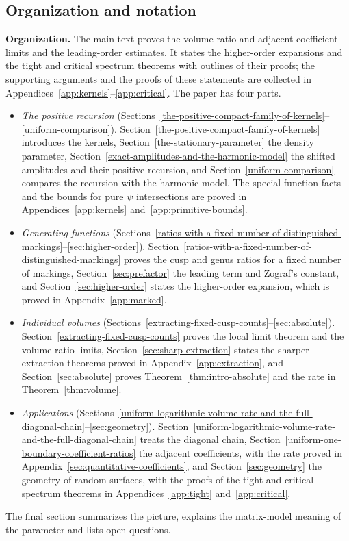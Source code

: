 \subsection{Organization and notation}\label{subsec:notation}
\textbf{Organization.}
The main text proves the volume-ratio and adjacent-coefficient limits and
the leading-order estimates. It states the higher-order expansions and
the tight and critical spectrum theorems with outlines of their proofs;
the supporting arguments and the proofs of these statements are collected
in Appendices~\ref{app:kernels}--\ref{app:critical}.
The paper has four parts.
\begin{itemize}[leftmargin=*]
\item \emph{The positive recursion}
(Sections~\ref{the-positive-compact-family-of-kernels}--\ref{uniform-comparison}).
Section~\ref{the-positive-compact-family-of-kernels} introduces the
kernels, Section~\ref{the-stationary-parameter} the density parameter,
Section~\ref{exact-amplitudes-and-the-harmonic-model} the shifted
amplitudes and their positive recursion, and
Section~\ref{uniform-comparison} compares the recursion with the harmonic
model. The special-function facts and the bounds for pure $\psi$
intersections are proved in Appendices~\ref{app:kernels}
and~\ref{app:primitive-bounds}.
\item \emph{Generating functions}
(Sections~\ref{ratios-with-a-fixed-number-of-distinguished-markings}--\ref{sec:higher-order}).
Section~\ref{ratios-with-a-fixed-number-of-distinguished-markings} proves
the cusp and genus ratios for a fixed number of markings,
Section~\ref{sec:prefactor} the leading term and Zograf's constant, and
Section~\ref{sec:higher-order} states the higher-order expansion, which is
proved in Appendix~\ref{app:marked}.
\item \emph{Individual volumes}
(Sections~\ref{extracting-fixed-cusp-counts}--\ref{sec:absolute}).
Section~\ref{extracting-fixed-cusp-counts} proves the local limit theorem
and the volume-ratio limits, Section~\ref{sec:sharp-extraction} states the
sharper extraction theorems proved in Appendix~\ref{app:extraction}, and
Section~\ref{sec:absolute} proves Theorem~\ref{thm:intro-absolute} and the
rate in Theorem~\ref{thm:volume}.
\item \emph{Applications}
(Sections~\ref{uniform-logarithmic-volume-rate-and-the-full-diagonal-chain}--\ref{sec:geometry}).
Section~\ref{uniform-logarithmic-volume-rate-and-the-full-diagonal-chain}
treats the diagonal chain,
Section~\ref{uniform-one-boundary-coefficient-ratios} the adjacent
coefficients, with the rate proved in
Appendix~\ref{sec:quantitative-coefficients}, and
Section~\ref{sec:geometry} the geometry of random surfaces, with the proofs
of the tight and critical spectrum theorems in Appendices~\ref{app:tight}
and~\ref{app:critical}.
\end{itemize}
The final section summarizes the picture, explains the matrix-model
meaning of the parameter and lists open questions.

